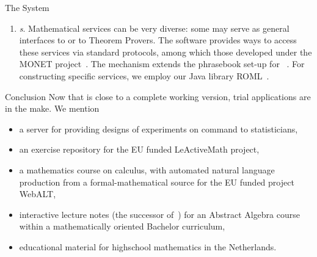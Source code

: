 \begin{omgroup}[id=mathdox2,short=MathDox,creators={amc,cuypers,barreiro}]
\begin{omgroup}[id=mathdox.cont_theory]{The {\MathDox} System}
\begin{enumerate}
  The document server is realized as a Java enhanced
  {}~\cite{URL:jsp} inside a web server.  It is not a monolithic
  entity. As shown in {}, it is formed by the system parts.  The
  {\emph{}} serves views to the client.  IMDs can be thought of
  as programs (scripts) encoding the production of a response.  In generating the
  response, they can make use of the information contained in the static context, and in
  the dynamic context (scopes and variables), the user input communicated along with
  request, and the results of computations carried on by one or more mathematical
  services.
  
  Another part is the {\emph{}} which is responsible
  for managing a repository of {\MathDox} mathematical theories.
  
  The final (third) part is the {\emph{}} which is
  responsible for the dynamic information.

\item {\em{}s}.  Mathematical services can be very diverse:
  some may serve as general interfaces to {\CAS} or to Theorem Provers.  The {\MathDox}
  software provides ways to access these services via standard protocols, among which
  those developed under the MONET project~\cite{URL:monet}.  The mechanism extends the
  phrasebook set-up for {\openmath}~\cite{CapCoh:uosdmc00,CapCoh:jpcaad00}.  For
  constructing specific {\openmath} services, we employ our Java {\openmath} library
  ROML~\cite{URL:roml}.
\end{enumerate}
\end{omgroup}

\begin{omgroup}{Conclusion}
Now that {\MathDox} is close to a complete working version, trial applications are in the
make. We mention
\begin{itemize}
\item a server for providing designs of experiments on command to statisticians,
\item an exercise repository for the EU funded LeActiveMath project,
\item a mathematics course on calculus, with automated natural language production from a
  formal-mathematical source for the EU funded project WebALT,
\item interactive lecture notes (the successor of~\cite{CohCuySterk:ida99}) for an
  Abstract Algebra course within a mathematically oriented Bachelor curriculum,
\item educational material for highschool mathematics in the Netherlands.
\end{itemize}
\end{omgroup}
\end{omgroup}

